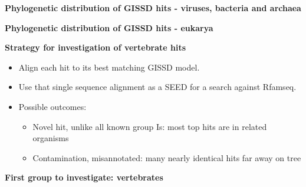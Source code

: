 \documentclass[landscape]{slides}
\begin{document}
\begin{slide}
\begin{center}
\small
\textbf{Phylogenetic distribution of GISSD hits - viruses, bacteria
  and archaea}
\end{center}


\vfill
\end{slide}
\begin{slide}
\begin{center}
\small
\textbf{Phylogenetic distribution of GISSD hits - eukarya}
\end{center}


\vfill
\end{slide}
\begin{slide}
\begin{center}
\textbf{Strategy for investigation of vertebrate hits}
\end{center}

\small
\begin{itemize}
\item Align each hit to its best matching GISSD model.
\item Use that single sequence alignment as a SEED for a search
  against Rfamseq.
\end{itemize}
\begin{itemize}
\item Possible outcomes:
\begin{itemize}
\item Novel hit, unlike all known group Is: most top hits are in
  related organisms
\item Contamination, misannotated: many nearly identical hits far away
  on tree
\end{itemize}
\end{itemize}

\vfill
\end{slide}
\begin{slide}
\begin{center}
\textbf{First group to investigate: vertebrates}
\end{center}


\vfill
\end{slide}
\end{document}

